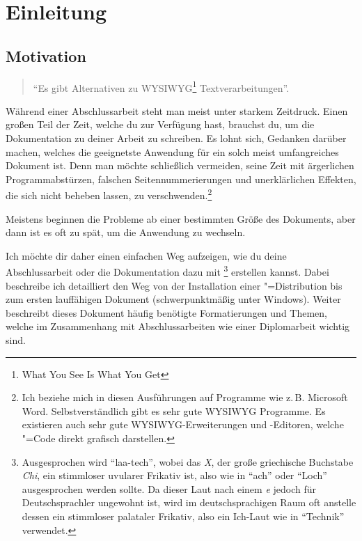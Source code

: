%
%

\chapter{Einleitung}

\section{Motivation}
\label{sec:motivation}

\begin{quote}
\enquote{Es gibt Alternativen zu WYSIWYG\footnote{What You See Is What You Get} Textverarbeitungen}.
\end{quote}

Während einer Abschlussarbeit steht man meist unter starkem Zeitdruck. Einen großen Teil der Zeit, welche du zur Verfügung hast, brauchst du, um die Dokumentation zu deiner Arbeit zu schreiben. Es lohnt sich, Gedanken darüber machen, welches die geeignetste Anwendung für ein solch meist umfangreiches Dokument ist. Denn man möchte schließlich vermeiden, seine Zeit mit ärgerlichen Programmabstürzen, falschen Seitennummerierungen und unerklärlichen Effekten, die sich nicht beheben lassen, zu verschwenden.\footnote{Ich beziehe mich in diesen Ausführungen auf Programme wie z.\,B. Microsoft Word. Selbstverständlich gibt es sehr gute WYSIWYG Programme. Es existieren auch sehr gute WYSIWYG-Erweiterungen und -Editoren, welche \DMLLaTeX"=Code direkt grafisch darstellen.}

Meistens beginnen die Probleme ab einer bestimmten Größe des Dokuments, aber dann ist es oft zu spät, um die Anwendung zu wechseln.

Ich möchte dir daher einen einfachen Weg aufzeigen, wie du deine Abschlussarbeit oder die Dokumentation dazu mit \DMLLaTeX\footnote{Ausgesprochen wird \DMLLaTeX{} \enquote{laa-tech}, wobei das \emph{X}, der große griechische Buchstabe \emph{Chi}, ein stimmloser uvularer Frikativ ist, also wie in \enquote{ach} oder \enquote{Loch} ausgesprochen werden sollte. Da dieser Laut nach einem \emph{e} jedoch für Deutschsprachler ungewohnt ist, wird im deutschsprachigen Raum oft anstelle dessen ein stimmloser palataler Frikativ, also ein Ich-Laut wie in \enquote{Technik} verwendet.} erstellen kannst. Dabei beschreibe ich detailliert den Weg von der Installation einer \DMLLaTeX"=Distribution bis zum ersten lauf\/fähigen Dokument (schwerpunktmäßig unter Windows). Weiter beschreibt dieses Dokument häufig benötigte Formatierungen und Themen, welche im Zusammenhang mit Abschlussarbeiten wie einer Diplomarbeit wichtig sind.

